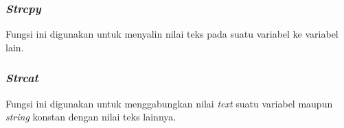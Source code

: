 \documentclass{subfiles}
\begin{document}
    \subsubsection{\textit{Strcpy}}
    \begin{indentlevel0}
        Fungsi ini digunakan untuk menyalin nilai teks pada suatu variabel ke variabel lain.
    \end{indentlevel0}
    \subsubsection{\textit{Strcat}}
    \begin{indentlevel0}
        Fungsi ini digunakan untuk menggabungkan nilai \textit{text} suatu variabel maupun \textit{string} konstan dengan nilai teks lainnya.
    \end{indentlevel0}
\end{document}
